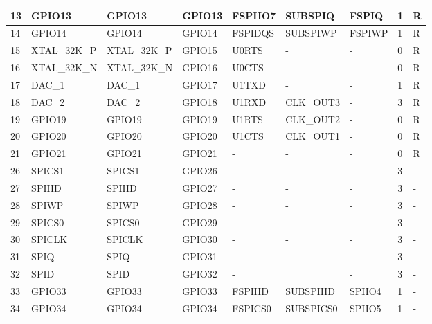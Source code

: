 \begin{longtable}[c]{|p{0.7cm}|p{1.9cm}|p{1.9cm}|p{1.6cm}|p{1.6cm}|p{1.8cm}|p{1.6cm}|p{0.7cm}|p{0.7cm}| }
13 & GPIO13          &  GPIO13       & GPIO13  & FSPIIO7    & SUBSPIQ      & FSPIQ       & 1 & R \\ \hline
14 & GPIO14          &  GPIO14       & GPIO14  & FSPIDQS    & SUBSPIWP     & FSPIWP      & 1 & R \\ \hline
15 & XTAL\_32K\_P    &  XTAL\_32K\_P & GPIO15  & U0RTS      & -            & -           & 0 & R \\ \hline
16 & XTAL\_32K\_N    &  XTAL\_32K\_N & GPIO16  & U0CTS      & -            & -           & 0 & R \\ \hline
17 & DAC\_1          &  DAC\_1       & GPIO17  & U1TXD      & -            & -           & 1 & R \\ \hline
18 & DAC\_2          &  DAC\_2       & GPIO18  & U1RXD      & CLK\_OUT3    & -           & 3 & R \\ \hline
19 & GPIO19          &  GPIO19       & GPIO19  & U1RTS      & CLK\_OUT2    & -           & 0 & R \\ \hline
20 & GPIO20          &  GPIO20       & GPIO20  & U1CTS      & CLK\_OUT1    & -           & 0 & R \\ \hline
21 & GPIO21          &  GPIO21       & GPIO21  & -          & -            & -           & 0 & R \\ \hline
26 & SPICS1          &  SPICS1       & GPIO26  & -          & -            & -           & 3 & -    \\ \hline
27 & SPIHD           &  SPIHD        & GPIO27  & -          & -            & -           & 3 & -    \\ \hline
28 & SPIWP           &  SPIWP        & GPIO28  & -          & -            & -           & 3 & -    \\ \hline
29 & SPICS0          &  SPICS0       & GPIO29  & -          & -            & -           & 3 & -    \\ \hline
30 & SPICLK          &  SPICLK       & GPIO30  & -          & -            & -           & 3 & -    \\ \hline
31 & SPIQ            &  SPIQ         & GPIO31  & -          & -            & -           & 3 & -    \\ \hline
32 & SPID            &  SPID         & GPIO32  & -          &              & -           & 3 & -    \\ \hline
33 & GPIO33          &  GPIO33       & GPIO33  & FSPIHD     & SUBSPIHD     & SPIIO4      & 1 & -    \\ \hline
34 & GPIO34          &  GPIO34       & GPIO34  & FSPICS0    & SUBSPICS0    & SPIIO5      & 1 & -    \\ \hline

\end{longtable}
